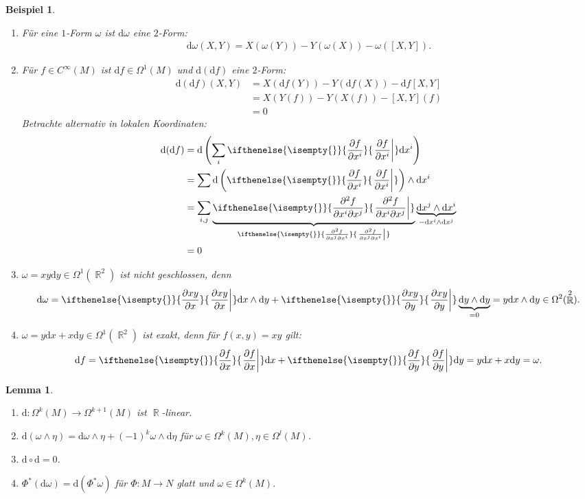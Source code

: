 \documentclass[paper=A4, twoside, chapterprefix=true, bibliography=totoc, headsepline]{scrbook}
\DeclareMathOperator{\R}{\mathbb{R}}
\newcommand{\dop}{\mathrm{d}}
\newcommand{\pdifffrac}[3][]{\ifthenelse{\isempty{#1}}{\frac{\partial #2}{\partial #3}}{\left. \frac{\partial #2}{\partial #3} \right|_{#1}}}
\theoremstyle{plain}
\newtheorem{Lemma}[Dfn]{Lemma}
\theoremstyle{nonumberplain}
\newtheorem{bsp}{Beispiel}
\theoremstyle{empty}
\theoremstyle{break}
\begin{document}
\begin{bsp}
  \begin{enumerate}[label=(\arabic*),leftmargin=*]
  \item F\"ur eine $1$-Form $\omega$ ist $\dop \omega$ eine $2$-Form:
    \begin{align*}
      \dop \omega(X,Y) = X(\omega(Y)) - Y(\omega(X)) - \omega([X,Y]).
    \end{align*}
  \item F\"ur $f \in C^{\infty}(M)$ ist $\dop f \in \Omega^1(M)$ und $\dop (\dop f)$ eine $2$-Form:
    \begin{align*}
      \dop(\dop f) (X,Y) & = X(\dop f(Y)) - Y(\dop f(X)) - \dop f [X,Y]\\
      & = X(Y(f)) - Y(X(f)) -[X,Y](f)\\
      & = 0
    \end{align*}
    Betrachte alternativ in lokalen Koordinaten:
    \begin{align*}
      \dop(\dop f) & = \dop\left(\sum_i \pdifffrac{f}{x^i}\dop x^i\right)\\
      & = \sum \dop \left(\pdifffrac{f}{x^i}\right) \wedge \dop x^i\\
      & = \sum_{i,j} \underbrace{\pdifffrac{^2 f}{x^i \partial x^j}}_{\pdifffrac{^2f}{x^j \partial x^{i}}} \underbrace{\dop x^j \wedge \dop x^i}_{- \dop x^i \wedge \dop x^{j}}\\
      & = 0
    \end{align*}
  \item $\omega = xy \dop y \in \Omega^1(\R^2)$ ist nicht geschlossen, denn
    \begin{align*}
      \dop \omega = \pdifffrac{xy}{x} \dop x \wedge \dop y + \pdifffrac{xy}{y}\underbrace{ \dop y \wedge \dop y}_{=0} = y \dop x \wedge \dop y \in \Omega^2(\R^2).
    \end{align*}
  \item $\omega = y \dop x + x \dop y \in \Omega^1(\R^2)$ ist exakt, denn f\"ur $f(x,y) = xy$ gilt:
    \begin{align*}
      \dop f = \pdifffrac{f}{x}\dop x + \pdifffrac{f}{y}\dop y = y \dop x + x \dop y = \omega.
    \end{align*}
  \end{enumerate}
\end{bsp}

\begin{Lemma}\label{lemma-5-9}
  \begin{enumerate}[label=(\roman*)]
  \item $\dop \colon \Omega^k(M) \to \Omega^{k+1}(M)$ ist $\R$-linear.
  \item $\dop(\omega \wedge \eta) = \dop \omega \wedge \eta + (-1)^k \omega \wedge \dop \eta$ f\"ur $\omega \in \Omega^k(M), \eta \in \Omega^l(M)$.
  \item $\dop \circ \dop = 0$.
  \item\label{lemma-5-9-iv} $\Phi^*(\dop \omega) = \dop (\Phi^{*}\omega)$ f\"ur $\Phi \colon M \to N$ glatt und $\omega \in \Omega^k(M)$.
  \end{enumerate}
\end{Lemma}
\end{document}

